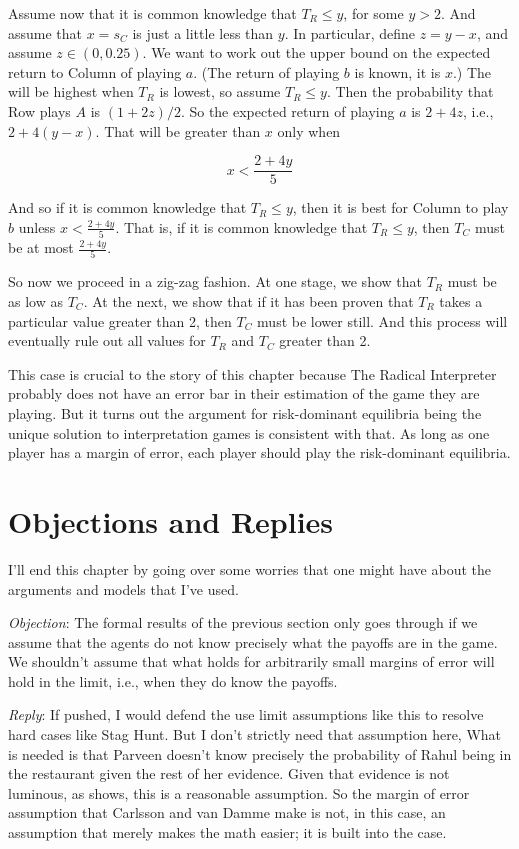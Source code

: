 \documentclass[11pt,]{book}
\begin{document}
Assume now that it is common knowledge that \(T_R \leq y\), for some \(y > 2\). And assume that \(x = s_C\) is just a little less than \(y\). In particular, define \(z = y -x\), and assume \(z \in (0, 0.25)\). We want to work out the upper bound on the expected return to Column of playing \(a\). (The return of playing \(b\) is known, it is \(x\).) The will be highest when \(T_R\) is lowest, so assume \(T_R \leq y\). Then the probability that Row plays \(A\) is \((1 + 2z)/2\). So the expected return of playing \(a\) is \(2 + 4z\), i.e., \(2 + 4(y - x)\). That will be greater than \(x\) only when

\[x < \frac{2 + 4y}{5}\]

And so if it is common knowledge that \(T_R \leq y\), then it is best for Column to play \(b\) unless \(x < \frac{2 + 4y}{5}\). That is, if it is common knowledge that \(T_R \leq y\), then \(T_C\) must be at most \(\frac{2 + 4y}{5}\).

So now we proceed in a zig-zag fashion. At one stage, we show that \(T_R\) must be as low as \(T_C\). At the next, we show that if it has been proven that \(T_R\) takes a particular value greater than 2, then \(T_C\) must be lower still. And this process will eventually rule out all values for \(T_R\) and \(T_C\) greater than 2.

This case is crucial to the story of this chapter because The Radical Interpreter probably does not have an error bar in their estimation of the game they are playing. But it turns out the argument for risk-dominant equilibria being the unique solution to interpretation games is consistent with that. As long as one player has a margin of error, each player should play the risk-dominant equilibria.

\hypertarget{evsolution}{%
\section{Objections and Replies}\label{evsolution}}

I'll end this chapter by going over some worries that one might have about the arguments and models that I've used.

\emph{Objection}: The formal results of the previous section only goes through if we assume that the agents do not know precisely what the payoffs are in the game. We shouldn't assume that what holds for arbitrarily small margins of error will hold in the limit, i.e., when they do know the payoffs.

\emph{Reply}: If pushed, I would defend the use limit assumptions like this to resolve hard cases like Stag Hunt. But I don't strictly need that assumption here, What is needed is that Parveen doesn't know precisely the probability of Rahul being in the restaurant given the rest of her evidence. Given that evidence is not luminous, as \citet{Williamson2000} shows, this is a reasonable assumption. So the margin of error assumption that Carlsson and van Damme make is not, in this case, an assumption that merely makes the math easier; it is built into the case.
\end{document}
